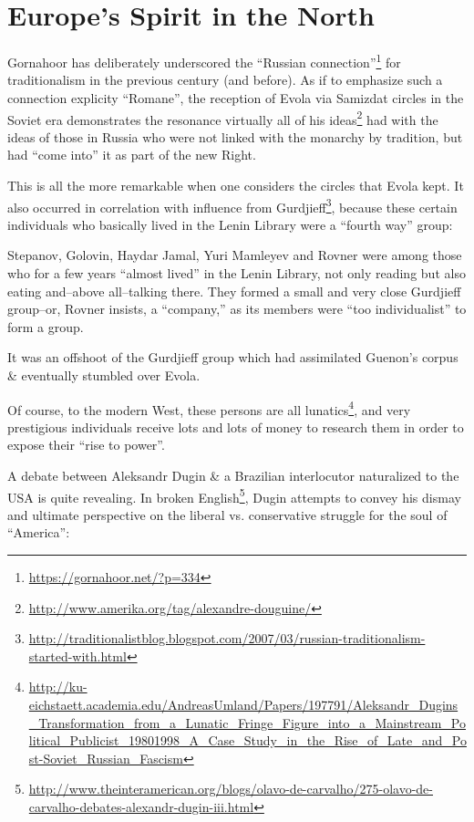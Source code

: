 \section{Europe’s Spirit in the North}

Gornahoor has deliberately underscored the ``Russian connection''\footnote{\url{https://gornahoor.net/?p=334}} for traditionalism in the previous century (and before). As if to emphasize such a connection explicity ``Romane'', the reception of Evola via Samizdat circles in the Soviet era demonstrates the resonance virtually all of his ideas\footnote{\url{http://www.amerika.org/tag/alexandre-douguine/}} had with the ideas of those in Russia who were not linked with the monarchy by tradition, but had ``come into'' it as part of the new Right.

This is all the more remarkable when one considers the circles that Evola kept. It also occurred in correlation with influence from Gurdjieff\footnote{\url{http://traditionalistblog.blogspot.com/2007/03/russian-traditionalism-started-with.html}}, because these certain individuals who basically lived in the Lenin Library were a ``fourth way'' group:

\begin{quotex}
Stepanov, Golovin, Haydar Jamal, Yuri Mamleyev and Rovner were among those who for a few years ``almost lived'' in the Lenin Library, not only reading but also eating and--above all--talking there. They formed a small and very close Gurdjieff group--or, Rovner insists, a ``company,'' as its members were ``too individualist'' to form a group.
\end{quotex}


It was an offshoot of the Gurdjieff group which had assimilated Guenon's corpus \& eventually stumbled over Evola.

Of course, to the modern West, these persons are all lunatics\footnote{\url{http://ku-eichstaett.academia.edu/AndreasUmland/Papers/197791/Aleksandr\_Dugins\_Transformation\_from\_a\_Lunatic\_Fringe\_Figure\_into\_a\_Mainstream\_Political\_Publicist\_19801998\_A\_Case\_Study\_in\_the\_Rise\_of\_Late\_and\_Post-Soviet\_Russian\_Fascism}}, and very prestigious individuals receive lots and lots of money to research them in order to expose their ``rise to power''.

A debate between Aleksandr Dugin \& a Brazilian interlocutor naturalized to the USA is quite revealing. In broken English\footnote{\url{http://www.theinteramerican.org/blogs/olavo-de-carvalho/275-olavo-de-carvalho-debates-alexandr-dugin-iii.html}}, Dugin attempts to convey his dismay and ultimate perspective on the liberal vs. conservative struggle for the soul of ``America'':

